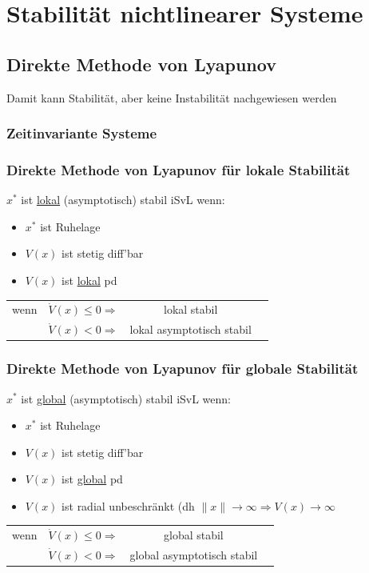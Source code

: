 \documentclass[german]{latex4ei/latex4ei_sheet}
\begin{document}
\section{Stabilität nichtlinearer Systeme}
\begin{sectionbox}

\subsection{Direkte Methode von Lyapunov}
Damit kann Stabilität, aber keine Instabilität nachgewiesen werden

\subsubsection{Zeitinvariante Systeme}

\subsubsection{Direkte Methode von Lyapunov für lokale Stabilität}

$x^*$ ist \underline{lokal} (asymptotisch) stabil iSvL wenn:
\begin{itemize}
  \item $x^*$ ist Ruhelage
  \item $V(x)$ ist stetig diff'bar
  \item $V(x)$ ist \underline{lokal} pd
\end{itemize}
\begin{tabular}{cccc}
  wenn  &$\dot{V}(x) \leq 0 \Rightarrow$& lokal stabil \\
   &$\dot{V}(x) < 0 \Rightarrow $& lokal asymptotisch stabil
\end{tabular}

\subsubsection{Direkte Methode von Lyapunov für globale Stabilität}

$x^*$ ist \underline{global} (asymptotisch) stabil iSvL wenn:
\begin{itemize}
  \item $x^*$ ist Ruhelage
  \item $V(x)$ ist stetig diff'bar
  \item $V(x)$ ist \underline{global} pd
  \item $V(x)$ ist radial unbeschränkt (dh $\|x\| \rightarrow \infty \Rightarrow V(x) \rightarrow \infty$
\end{itemize}
\begin{tabular}{cccc}
  wenn  &$\dot{V}(x) \leq 0 \Rightarrow$& global stabil \\
   &$\dot{V}(x) < 0 \Rightarrow $& global asymptotisch stabil
\end{tabular}


\end{sectionbox}
\end{document}
